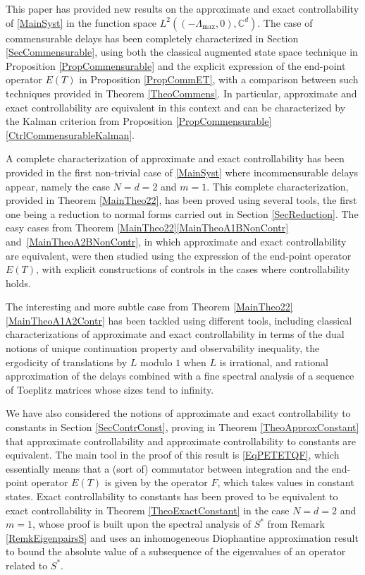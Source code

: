 This paper has provided new results on the approximate and exact controllability of \eqref{MainSyst} in the function space $L^2((-\Lambda_{\max}, 0), \mathbb C^d)$. The case of commensurable delays has been completely characterized in Section \ref{SecCommensurable}, using both the classical augmented state space technique in Proposition \ref{PropCommensurable} and the explicit expression of the end-point operator $E(T)$ in Proposition \ref{PropCommET}, with a comparison between such techniques provided in Theorem \ref{TheoCommens}. In particular, approximate and exact controllability are equivalent in this context and can be characterized by the Kalman criterion from Proposition \ref{PropCommensurable}\eqref{CtrlCommensurableKalman}.

A complete characterization of approximate and exact controllability has been provided in the first non-trivial case of \eqref{MainSyst} where incommensurable delays appear, namely the case $N = d = 2$ and $m = 1$. This complete characterization, provided in Theorem \ref{MainTheo22}, has been proved using several tools, the first one being a reduction to normal forms carried out in Section \ref{SecReduction}. The easy cases from Theorem \ref{MainTheo22}\eqref{MainTheoA1BNonContr} and~\eqref{MainTheoA2BNonContr}, in which approximate and exact controllability are equivalent, were then studied using the expression of the end-point operator $E(T)$, with explicit constructions of controls in the cases where controllability holds.

The interesting and more subtle case from Theorem \ref{MainTheo22}\eqref{MainTheoA1A2Contr} has been tackled using different tools, including classical characterizations of approximate and exact controllability in terms of the dual notions of unique continuation property and observability inequality, the ergodicity of translations by $L$ modulo $1$ when $L$ is irrational, and rational approximation of the delays combined with a fine spectral analysis of a sequence of Toeplitz matrices whose sizes tend to infinity.

We have also considered the notions of approximate and exact controllability to constants in Section \ref{SecContrConst}, proving in Theorem \ref{TheoApproxConstant} that approximate controllability and approximate controllability to constants are equivalent. The main tool in the proof of this result is \eqref{EqPETETQF}, which essentially means that a (sort of) commutator between integration and the end-point operator $E(T)$ is given by the operator $F$, which takes values in constant states. Exact controllability to constants has been proved to be equivalent to exact controllability in Theorem \ref{TheoExactConstant} in the case $N = d = 2$ and $m = 1$, whose proof is built upon the spectral analysis of $S^\ast$ from Remark \ref{RemkEigenpairsS} and uses an inhomogeneous Diophantine approximation result to bound the absolute value of a subsequence of the eigenvalues of an operator related to $S^\ast$.

